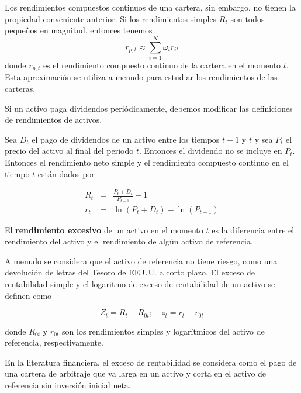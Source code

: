 \documentclass[12pt,]{krantz}
\theoremstyle{definition}
\theoremstyle{definition}
\theoremstyle{definition}
\theoremstyle{remark}
\let\BeginKnitrBlock\begin \let\EndKnitrBlock\end
\begin{document}
Los rendimientos compuestos continuos de una cartera, sin embargo, no
tienen la propiedad conveniente anterior. Si los rendimientos simples
\(R_t\) son todos pequeños en magnitud, entonces tenemos
\[r_{p,t} \approx \sum_{i=1}^N\omega_ir_{it}\] donde \(r_{p,t}\) es el
rendimiento compuesto continuo de la cartera en el momento \(t\). Esta
aproximación se utiliza a menudo para estudiar los rendimientos de las
carteras.

\BeginKnitrBlock{definition}[Pago de dividendos]
\protect\hypertarget{def:defi-pago-dividendos}{}{\label{def:defi-pago-dividendos}
{} }Si un activo paga dividendos
periódicamente, debemos modificar las definiciones de rendimientos de
activos.

Sea \(D_t\) el pago de dividendos de un activo entre los tiempos \(t-1\)
y \(t\) y sea \(P_t\) el precio del activo al final del periodo \(t\).
Entonces el dividendo no se incluye en \(P_t\). Entonces el rendimiento
neto simple y el rendimiento compuesto continuo en el tiempo \(t\) están
dados por

\begin{eqnarray*}
R_t &=& \frac{P_t+D_t}{P_{t-1}}-1 \\
r_t &=& \ln(P_t+D_t) - \ln(P_{t-1})
\end{eqnarray*}
\EndKnitrBlock{definition}

\BeginKnitrBlock{definition}[Exceso de rendimiento]
\protect\hypertarget{def:exceso-rendimiento}{}{\label{def:exceso-rendimiento}
{} }El \textbf{rendimiento excesivo}
de un activo en el momento \(t\) es la diferencia entre el rendimiento
del activo y el rendimiento de algún activo de referencia.
\EndKnitrBlock{definition}

A menudo se considera que el activo de referencia no tiene riesgo, como
una devolución de letras del Tesoro de EE.UU. a corto plazo. El exceso
de rentabilidad simple y el logaritmo de exceso de rentabilidad de un
activo se definen como

\begin{equation}
Z_t = R_t-R_{0t}; \quad z_t=r_t-r_{0t}
\label{eq:eq-exceso-rentabilidad-simple-log}
\end{equation}

donde \(R_{0t}\) y \(r_{0t}\) son los rendimientos simples y
logarítmicos del activo de referencia, respectivamente.

En la literatura financiera, el exceso de rentabilidad se considera como
el pago de una cartera de arbitraje que va larga en un activo y corta en
el activo de referencia sin inversión inicial neta.
\end{document}

